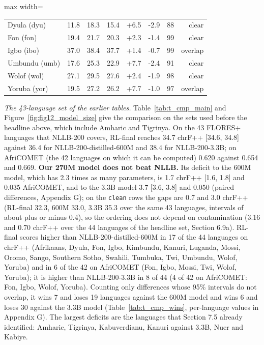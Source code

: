 \begin{table}[t]
\begin{adjustbox}{max width=\linewidth}
{\begin{tabular}{@{}lrrrrrrr@{}}
Dyula (dyu) & 11.8 & 18.3 & 15.4 & +6.5 & -2.9 & 88 & clear \\
Fon (fon) & 19.4 & 21.7 & 20.3 & +2.3 & -1.4 & 99 & clear \\
Igbo (ibo) & 37.0 & 38.4 & 37.7 & +1.4 & -0.7 & 99 & overlap \\
Umbundu (umb) & 17.6 & 25.3 & 22.9 & +7.7 & -2.4 & 91 & clear \\
Wolof (wol) & 27.1 & 29.5 & 27.6 & +2.4 & -1.9 & 98 & clear \\
Yoruba (yor) & 19.5 & 27.2 & 26.2 & +7.7 & -1.0 & 97 & overlap \\
\bottomrule
\end{tabular}
}
\end{adjustbox}
\end{table}

\emph{The 43-language set of the earlier tables.} Table~\ref{tab:t_cmp_main} and Figure~\ref{fig:fig12_model_size} give the comparison on the sets used before the headline above, which include Amharic and Tigrinya. On the 43 FLORES+ languages that NLLB-200 covers, RL-final reaches 34.7 chrF++ {[}34.6, 34.8{]} against 36.4 for NLLB-200-distilled-600M and 38.4 for NLLB-200-3.3B; on AfriCOMET (the 42 languages on which it can be computed) 0.620 against 0.654 and 0.669. \textbf{Our 270M model does not beat NLLB.} Its deficit to the 600M model, which has 2.3 times as many parameters, is 1.7 chrF++ {[}1.6, 1.8{]} and 0.035 AfriCOMET, and to the 3.3B model 3.7 {[}3.6, 3.8{]} and 0.050 (paired differences, Appendix G); on the \texttt{clean} rows the gaps are 0.7 and 3.0 chrF++ (RL-final 32.3, 600M 33.0, 3.3B 35.3 over the same 43 languages, intervals of about plus or minus 0.4), so the ordering does not depend on contamination (3.16 and 0.70 chrF++ over the 44 languages of the headline set, Section 6.9a). RL-final scores higher than NLLB-200-distilled-600M in 17 of the 44 languages on chrF++ (Afrikaans, Dyula, Fon, Igbo, Kimbundu, Kanuri, Luganda, Mossi, Oromo, Sango, Southern Sotho, Swahili, Tumbuka, Twi, Umbundu, Wolof, Yoruba) and in 6 of the 42 on AfriCOMET (Fon, Igbo, Mossi, Twi, Wolof, Yoruba); it is higher than NLLB-200-3.3B in 8 of 44 (4 of 42 on AfriCOMET: Fon, Igbo, Wolof, Yoruba). Counting only differences whose 95\% intervals do not overlap, it wins 7 and loses 19 languages against the 600M model and wins 6 and loses 30 against the 3.3B model (Table~\ref{tab:t_cmp_wins}, per-language values in Appendix G). The largest deficits are the languages that Section 7.5 already identified: Amharic, Tigrinya, Kabuverdianu, Kanuri against 3.3B, Nuer and Kabiye.

